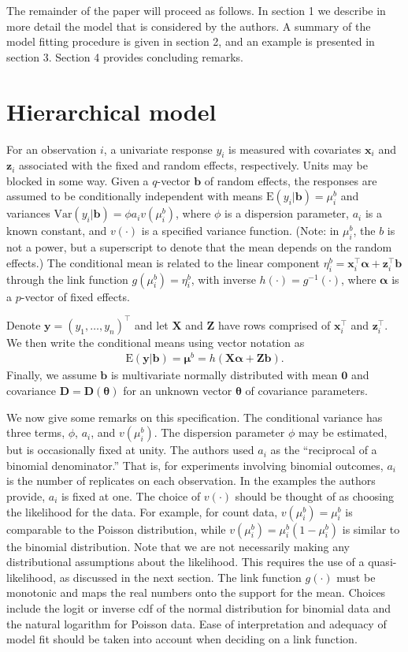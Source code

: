 \documentclass[12pt]{article}
\newcommand{\m}[1]{\mathbf{\bm{#1}}}
\newcommand{\E}{\mathrm{E}}
\newcommand{\Var}{\mathrm{Var}}
\begin{document}
The remainder of the paper will proceed as follows. In section 1 we describe in more detail the model that is considered by the authors. A summary of the model fitting procedure is given in section 2, and an example is presented in section 3. Section 4 provides concluding remarks.

\section{Hierarchical model}
 
\noindent For an observation $i$, a univariate response $y_i$ is measured with covariates $\m{x}_i$ and $\m{z}_i$ associated with the fixed and random effects, respectively. Units may be blocked in some way. Given a $q$-vector $\m{b}$ of random effects, the responses are assumed to be conditionally independent with means $\E(y_i|\m{b})=\mu_i^b$ and variances $\Var(y_i|\m{b}) = \phi a_i v(\mu_i^b)$, where $\phi$ is a dispersion parameter, $a_i$ is a known constant, and $v(\cdot)$ is a specified variance function. (Note: in $\mu_i^b$, the $b$ is not a power, but a superscript to denote that the mean depends on the random effects.) The conditional mean is related to the linear component $\eta_i^b=\m{x}_i^\top\m{\alpha}+\m{z}_i^\top\m{b}$ through the link function $g(\mu_i^b)=\eta_i^b$, with inverse $h(\cdot)=g^{-1}(\cdot)$, where $\m{\alpha}$ is a $p$-vector of fixed effects.

Denote $\m{y}=(y_1,\ldots,y_n)^\top$ and let $\m{X}$ and $\m{Z}$ have rows comprised of $\m{x}_i^\top$ and $\m{z}_i^\top$. We then write the conditional means using vector notation as
\begin{eqnarray}
\E(\m{y}|\m{b}) = \m{\mu}^b = h(\m{X}\m{\alpha} + \m{Z}\m{b}).
\label{mod}
\end{eqnarray}
Finally, we assume $\m{b}$ is multivariate normally distributed with mean $\m{0}$ and covariance $\m{D}=\m{D}(\m{\theta})$ for an unknown vector $\m{\theta}$ of covariance parameters.

We now give some remarks on this specification. The conditional variance has three terms, $\phi$, $a_i$, and $v(\mu_i^b)$. The dispersion parameter $\phi$ may be estimated, but is occasionally fixed at unity. The authors used $a_i$ as the ``reciprocal of a binomial denominator.'' That is, for experiments involving binomial outcomes, $a_i$ is the number of replicates on each observation. In the examples the authors provide, $a_i$ is fixed at one. The choice of $v(\cdot)$ should be thought of as choosing the likelihood for the data. For example, for count data, $v(\mu_i^b)=\mu_i^b$ is comparable to the Poisson distribution, while $v(\mu_i^b)=\mu_i^b(1-\mu_i^b)$ is similar to the binomial distribution. Note that we are not necessarily making any distributional assumptions about the likelihood. This requires the use of a quasi-likelihood, as discussed in the next section. The link function $g(\cdot)$ must be monotonic and maps the real numbers onto the support for the mean. Choices include the logit or inverse cdf of the normal distribution for binomial data and the natural logarithm for Poisson data. Ease of interpretation and adequacy of model fit should be taken into account when deciding on a link function.
\end{document}
